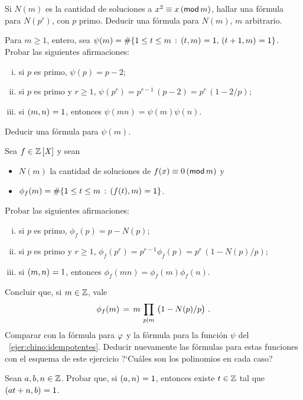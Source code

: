 \begin{ejerChino}\label{ejer:chino:idempotentes}
	Si $N(m)$ es la cantidad de soluciones a $x^2\equiv x\tmodulo[m]$,
	hallar una f\'ormula para $N(p^r)$, con $p$ primo.%
	Deducir una f\'ormula para $N(m)$, $m$ arbitrario.
\end{ejerChino}

\begin{ejerChino}\label{ejer:chino:idempotentes:bis}
	Para $m\geq 1$, entero, sea
	\begin{math}
		\psi(m)=\cardinal{%
			\{1\leq t\leq m\,:\,
				\mcd{t,m}=1,\,\mcd{t+1,m}=1\}
			}
	\end{math}.
	Probar las siguientes afirmaciones:
	\begin{enumerate}[(i)]
		\item si $p$ es primo, $\psi(p)=p-2$;
		\item si $p$ es primo y $r\geq 1$,
			$\psi(p^r)=p^{r-1}\,(p-2)=p^r\,(1-2/p)$;
		\item si $\mcd{m,n}=1$, entonces $\psi(mn)=\psi(m)\psi(n)$.
	\end{enumerate}
	Deducir una f\'ormula para $\psi(m)$.
\end{ejerChino}

\begin{ejerChino}\label{ejer:chino:polinomial}
	Sea $f\in\polinomios\Enteros$ y sean
	\begin{itemize}
		\item $N(m)$ la cantidad de soluciones de
			$f(x)\equiv 0\tmodulo[m]$ y
		\item
			\begin{math}
				\phi_f(m)=\cardinal{
					\{1\leq t\leq m\,:\,\mcd{f(t),m}=1\}
					}
			\end{math}.
	\end{itemize}
	Probar las siguientes afirmaciones:
	\begin{enumerate}[(i)]
		\item si $p$ es primo, $\phi_f(p)=p-N(p)$;
		\item si $p$ es primo y $r\geq 1$,
			$\phi_f(p^r)=p^{r-1}\phi_f(p)=p^r\,(1-N(p)/p)$;
		\item si $\mcd{m,n}=1$, entonces
			$\phi_f(mn)=\phi_f(m)\phi_f(n)$.
	\end{enumerate}
	Concluir que, si $m\in\Enteros$, vale
	\begin{displaymath}
		\phi_f(m)\,=\,m\,\prod_{p\mid m}\,\big(1-N(p)/p\big)
		\dispstop
	\end{displaymath}
	Comparar con la f\'ormula para $\eulerphi$ y la f\'ormula para
	la funci\'on $\psi$ del \ejername~\ref{ejer:chino:idempotentes}.
	Deducir nuevamente las f\'ormulas para estas funciones con el
	esquema de este ejercicio ?`Cu\'ales son los polinomios en cada
	caso?
\end{ejerChino}

\begin{ejerChino}
	Sean $a,b,n\in\Enteros$. Probar que, si $\mcd{a,n}=1$, entonces
	existe $t\in\Enteros$ tal que
	\begin{math}
		\mcd{at+n,b}=1
	\end{math}.
\end{ejerChino}

